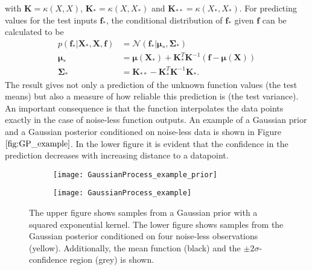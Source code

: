 \documentclass[../main.tex]{subfiles}
\begin{document}
with $\mathbf{K} = \kappa(X,X)$, $\mathbf{K_*} = \kappa(X,X_*)$ and $\mathbf{K_{**}} = \kappa(X_*,X_*)$. For predicting values for the test inputs $\mathbf{f}_*$, the conditional distribution of $\mathbf{f}_*$ given $\mathbf{f}$ can be calculated to be
\begin{align}
    p(\mathbf{f}_*|\mathbf{X}_*,\mathbf{X},\mathbf{f}) &= \mathcal{N}(\mathbf{f}_*|\boldsymbol{\mu}_*,\boldsymbol{\Sigma}_*)\\
    \boldsymbol{\mu}_* &= \boldsymbol{\mu}(\mathbf{X}_*)+\mathbf{K}^T_*\mathbf{K}^{-1}(\mathbf{f}-\boldsymbol{\mu}(\mathbf{X}))\\
    \boldsymbol{\Sigma}_* &= \mathbf{K}_{**} - \mathbf{K}^T_*\mathbf{K}^{-1}\mathbf{K}_*.
\end{align}
The result gives not only a prediction of the unknown function values (the test means) but also a measure of how reliable this prediction is (the test variance). An important consequence is that the function interpolates the data points exactly in the case of noise-less function outputs. An example of a Gaussian prior and a Gaussian posterior conditioned on noise-less data is shown in Figure $\ref{fig:GP_example}$. In the lower figure it is evident that the confidence in the prediction decreases with increasing distance to a datapoint.\par

\begin{figure}
    \centering
    \begin{subfigure}[b]{\textwidth}
    \texttt{[image: GaussianProcess\_example\_prior]}
    \end{subfigure}
    
    \begin{subfigure}[b]{\textwidth}
    \texttt{[image: GaussianProcess\_example]}
    \end{subfigure}
    \caption{The upper figure shows samples from a Gaussian prior with a squared exponential kernel. The lower figure shows samples from the Gaussian posterior conditioned on four noise-less observations (yellow). Additionally, the mean function (black) and the $\pm 2 \sigma$-confidence region (grey) is shown.}    
    \label{fig:GP_example}
\end{figure}
\end{document}
